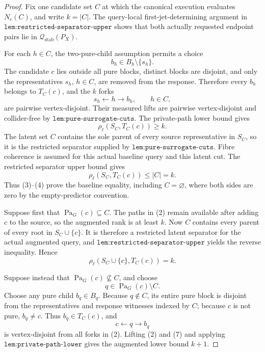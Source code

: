 \documentclass{article}
\begin{document}
\begin{proof}
Fix one candidate set \(C\) at which the canonical execution evaluates \(N_c(C)\), and write \(k=|C|\).  The query-local first-jet-determining argument in \(\texttt{lem:restricted-separator-upper}\) shows that both actually requested endpoint pairs lie in \(\mathcal Q_{\mathrm{stab}}(P_X)\).

For each \(h\in C\), the two-pure-child assumption permits a choice
\[
 b_h\in B_h\setminus\{s_h\}. \tag{1}
\]
The candidate \(c\) lies outside all pure blocks, distinct blocks are disjoint, and only the representatives \(s_h\), \(h\in C\), are removed from the response.  Therefore every \(b_h\) belongs to \(T_C(c)\), and the \(k\) forks
\[
 s_h\leftarrow h\to b_h,
 \qquad h\in C, \tag{2}
\]
are pairwise vertex-disjoint.  Their measured lifts are pairwise vertex-disjoint and collider-free by \(\texttt{lem:pure-surrogate-cuts}\).  The private-path lower bound gives
\[
 \rho_\ell(S_C,T_C(c))\geq k. \tag{3}
\]
The latent set \(C\) contains the sole parent of every source representative in \(S_C\), so it is the restricted separator supplied by \(\texttt{lem:pure-surrogate-cuts}\).  Fibre coherence is assumed for this actual baseline query and this latent cut.  The restricted separator upper bound gives
\[
 \rho_\ell(S_C,T_C(c))\leq |C|=k. \tag{4}
\]
Thus (3)--(4) prove the baseline equality, including \(C=\varnothing\), where both sides are zero by the empty-predictor convention.

Suppose first that \(\operatorname{Pa}_G(c)\subseteq C\).  The paths in (2) remain available after adding \(c\) to the source, so the augmented rank is at least \(k\).  Now \(C\) contains every parent of every root in \(S_C\cup\{c\}\).  It is therefore a restricted latent separator for the actual augmented query, and \(\texttt{lem:restricted-separator-upper}\) yields the reverse inequality.  Hence
\[
 \rho_\ell(S_C\cup\{c\},T_C(c))=k. \tag{5}
\]

Suppose instead that \(\operatorname{Pa}_G(c)\nsubseteq C\), and choose
\[
 q\in\operatorname{Pa}_G(c)\setminus C. \tag{6}
\]
Choose any pure child \(b_q\in B_q\).  Because \(q\notin C\), its entire pure block is disjoint from the representatives and response witnesses indexed by \(C\); because \(c\) is not pure, \(b_q\neq c\).  Thus \(b_q\in T_C(c)\), and
\[
 c\leftarrow q\to b_q \tag{7}
\]
is vertex-disjoint from all forks in (2).  Lifting (2) and (7) and applying \(\texttt{lem:private-path-lower}\) gives the augmented lower bound \(k+1\).


\end{proof}
\end{document}
